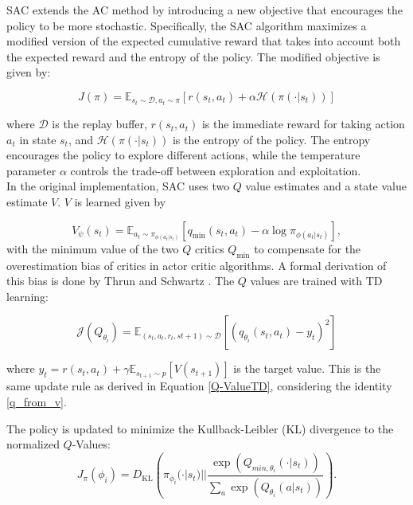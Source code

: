 SAC extends the AC method by introducing a new objective that encourages the policy to be more stochastic. Specifically, the SAC algorithm maximizes a modified 
version of the expected cumulative reward that takes into account both the expected reward and the entropy of the policy. The modified objective is given by:

\begin{equation}
J(\pi) = \mathbb{E}_{s_t \sim \mathcal{D}, a_t \sim \pi}[r(s_t, a_t) + \alpha \mathcal{H}(\pi(\cdot|s_t))]
\end{equation}

where $\mathcal{D}$ is the replay buffer, $r(s_t, a_t)$ is the immediate reward for taking action $a_t$ in state $s_t$, and $\mathcal{H}(\pi(\cdot|s_t))$ is the entropy of the policy. The entropy 
encourages the policy to explore different actions, while the temperature parameter $\alpha$ controls the trade-off between exploration and exploitation.\\

In the original implementation, SAC uses two $Q$ value estimates and a state value estimate $V$. $V$ is learned given by 

\begin{equation}
    V_{\psi}(s_t) = \mathbb{E}_{a_t \sim \pi_{\phi(a_t|s_t)}}[q_\text{min}(s_t, a_t) - \alpha \log \pi_{\phi(a_t|s_t)}],
\end{equation}
with the minimum value of the two $Q$ critics $Q_\text{min}$ to compensate for the overestimation bias of critics in actor critic 
algorithms. A formal derivation of this bias is done by Thrun and Schwartz \cite{thrun1993issues}. 
The $Q$ values are trained with TD learning:

\begin{equation}
    \mathcal{J}(Q_{\theta_i}) = \mathbb{E}_{(s_t, a_t, r_t, s{t+1}) \sim \mathcal{D}}[(q_{\theta_i}(s_t,a_t) - y_t)^2]
\end{equation}

where $y_t = r(s_t, a_t) + \gamma \mathbb{E}_{s_{t+1} \sim p}[V(s_{t+1})]$ is the target value. This is the same update rule as derived in Equation \ref{Q-ValueTD}, 
considering the identity \ref{q_from_v}.

The policy is updated to minimize the Kullback-Leibler (KL) divergence to the normalized $Q$-Values:
\begin{equation}
    \label{sac_pol_obj}
    J_\pi(\phi_{i}) = D_{\mathrm{KL}} \left( \pi_{\phi_{i}}(\cdot|s_t) || \frac{\exp(Q_{min, {\theta_i}}(\cdot|s_t))}{\underset{a}{\sum}  \exp(Q_{\theta_i}(a|s_t))} \right).
\end{equation}

